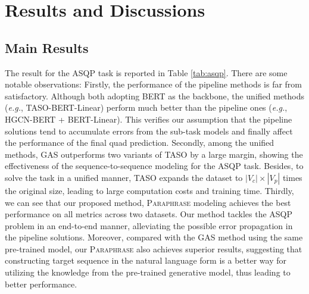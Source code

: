 \documentclass[11pt]{article}
\begin{document}
\section{Results and Discussions}

\subsection{Main Results}

The result for the ASQP task is reported in Table \ref{tab:asqp}. There are some notable observations:
Firstly, the performance of the pipeline methods is far from satisfactory. Although both adopting BERT as the backbone, the unified methods (\textit{e.g.}, TASO-BERT-Linear) perform much better than the pipeline ones (\textit{e.g.}, HGCN-BERT + BERT-Linear). 
This verifies our assumption that the pipeline solutions tend to accumulate errors from the sub-task models and finally affect the performance of the final quad prediction.
Secondly, among the unified methods, GAS outperforms two variants of TASO by a large margin, showing the effectiveness of the sequence-to-sequence modeling for the ASQP task. Besides, to solve the task in a unified manner, TASO expands the dataset to $|V_c|\times |V_p|$ times the original size, leading to large computation costs and training time.
Thirdly, we can see that our proposed method, \textsc{Paraphrase} modeling achieves the best performance on all metrics across two datasets. Our method tackles the ASQP problem in an end-to-end manner, alleviating the possible error propagation in the pipeline solutions.
Moreover, compared with the GAS method using the same pre-trained model, our \textsc{Paraphrase} also achieves superior results, suggesting that constructing target sequence in the natural language form is a better way for utilizing the knowledge from the pre-trained generative model, thus leading to better performance.
\end{document}
